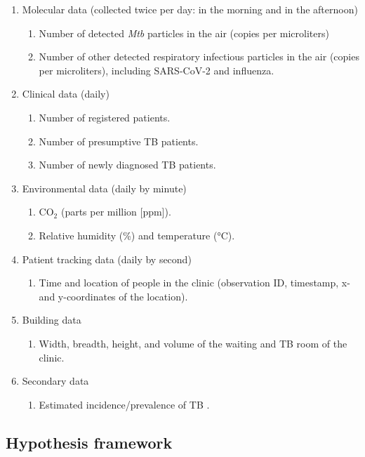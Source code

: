 \documentclass{article}
\begin{document}
\begin{enumerate}
    \item Molecular data (collected twice per day: in the morning and in the afternoon)
    \begin{enumerate}
        \item Number of detected \emph{Mtb} particles in the air (copies per microliters)
        \item Number of other detected respiratory infectious particles in the air (copies per microliters), including SARS-CoV-2 and influenza. 
    \end{enumerate}
    \item Clinical data (daily)
    \begin{enumerate}
        \item Number of registered patients.
        \item Number of presumptive TB patients.
        \item Number of newly diagnosed TB patients.
    \end{enumerate}
    \item Environmental data (daily by minute)
    \begin{enumerate}
        \item CO$_2$ (parts per million [ppm]).
        \item Relative humidity (\%) and temperature (°C).
    \end{enumerate}
    \item Patient tracking data (daily by second)
    \begin{enumerate}
        \item Time and location of people in the clinic (observation ID, timestamp, x- and y-coordinates of the location).
    \end{enumerate}
    \item Building data
    \begin{enumerate}
        \item Width, breadth, height, and volume of the waiting and TB room of the clinic.
    \end{enumerate}
    \item Secondary data
    \begin{enumerate}
        \item Estimated incidence/prevalence of TB \cite{WHO2022TBReport}.
    \end{enumerate}
\end{enumerate}

\subsection{Hypothesis framework}
\end{document}
